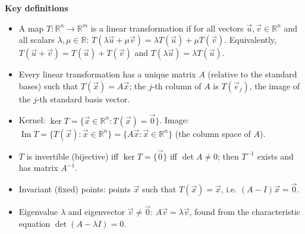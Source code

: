 \documentclass[11pt]{article}
\newcommand{\cle}[1]{{\popxbold\color{popdark}#1}}
\begin{document}
\begin{aretenir}

\textbf{Key definitions}
\begin{itemize}
\item A map $T:\mathbb{R}^{n}\to\mathbb{R}^{m}$ is a \cle{linear transformation} if for all vectors $\vec{u},\vec{v}\in\mathbb{R}^{n}$ and all scalars $\lambda,\mu\in\mathbb{R}$: $T(\lambda\vec{u}+\mu\vec{v})=\lambda T(\vec{u})+\mu T(\vec{v})$. Equivalently, $T(\vec{u}+\vec{v})=T(\vec{u})+T(\vec{v})$ and $T(\lambda\vec{u})=\lambda T(\vec{u})$.
\item Every linear transformation has a unique \cle{matrix} $A$ (relative to the standard bases) such that $T(\vec{x})=A\vec{x}$; the $j$-th column of $A$ is $T(\vec{e}_j)$, the image of the $j$-th standard basis vector.
\item \cle{Kernel}: $\ker T=\{\vec{x}\in\mathbb{R}^{n}:T(\vec{x})=\vec{0}\}$. \cle{Image}: $\operatorname{Im}T=\{T(\vec{x}):\vec{x}\in\mathbb{R}^{n}\}=\{A\vec{x}:\vec{x}\in\mathbb{R}^{n}\}$ (the column space of $A$).
\item $T$ is \cle{invertible} (bijective) iff $\ker T=\{\vec{0}\}$ iff $\det A\neq 0$; then $T^{-1}$ exists and has matrix $A^{-1}$.
\item \cle{Invariant (fixed) points}: points $\vec{x}$ such that $T(\vec{x})=\vec{x}$, i.e. $(A-I)\vec{x}=\vec{0}$.
\item \cle{Eigenvalue} $\lambda$ and \cle{eigenvector} $\vec{v}\neq\vec{0}$: $A\vec{v}=\lambda\vec{v}$, found from the \cle{characteristic equation} $\det(A-\lambda I)=0$.
\end{itemize}


\end{aretenir}
\end{document}
